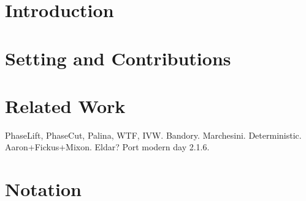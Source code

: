 \section{Introduction}

\section{Setting and Contributions}

\section{Related Work}

PhaseLift, PhaseCut, Palina, WTF, IVW.  Bandory.  Marchesini.  Deterministic.  Aaron+Fickus+Mixon.  Eldar?  Port modern day 2.1.6.
\section{Notation}
\label{sec:notation}

